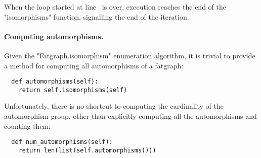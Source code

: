 When the loop started at line~ is over, execution
reaches the end of the "isomorphisms" function, signalling the end of
the iteration.

\paragraph{Computing automorphisms.}
Given the "Fatgraph.isomorphism" enumeration algorithm, it is trivial
to provide a method for computing all automorphisms of a fatgraph:
\begin{lstlisting}
  def automorphisms(self):
    return self.isomorphisms(self)

\end{lstlisting}
Unfortunately, there is no shortcut to computing the cardinality of
the automorphism group, other than explicitly computing all the
automorphisms and counting them:
\begin{lstlisting}
  def num_automorphisms(self):
    return len(list(self.automorphisms()))

\end{lstlisting}

